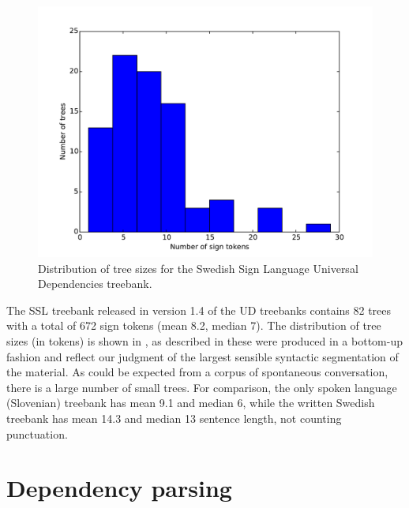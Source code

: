 \documentclass[11pt]{article}
\begin{document}
\begin{figure}[tb]
	\centering
	\includegraphics[width=\linewidth]{treesizes.pdf}
    \caption{Distribution of tree sizes for the Swedish Sign
        Language Universal Dependencies treebank.}
	\label{fig:treesizes}
\end{figure}

The SSL treebank released in version 1.4 of the UD treebanks contains 82 trees
with a total of 672 sign tokens (mean 8.2, median 7).  The distribution of
tree sizes (in tokens) is shown in , as described in
 these were produced in a bottom-up fashion and reflect
our judgment of the largest sensible syntactic segmentation of the material.
As could be expected from a corpus of spontaneous conversation, there is a
large number of small trees. For comparison, the only spoken language
(Slovenian) treebank has mean 9.1 and median 6, while the written Swedish
treebank %
has mean 14.3 and median 13 sentence length, not counting punctuation.

\section{Dependency parsing}
\end{document}
